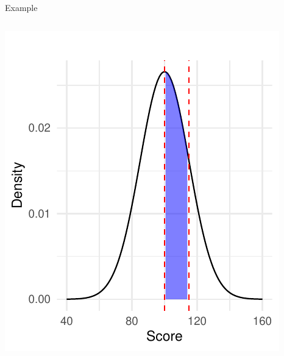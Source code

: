 \documentclass[
  ignorenonframetext,
]{beamer}
\begin{document}
\begin{frame}[fragile]{Example}
\begin{columns}[T]
\begin{column}{0.5\textwidth}
\includegraphics{M5-Hypothesis-Testing,-Probability-and-Distribution_files/figure-beamer/unnamed-chunk-24-1.pdf}
\end{column}
\end{columns}
\end{frame}
\end{document}
